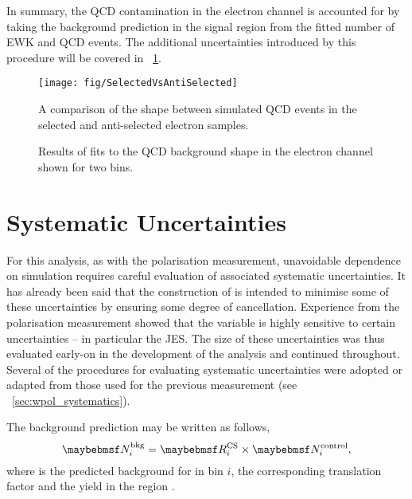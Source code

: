 In summary, the \ac{QCD} contamination in the electron channel is accounted for
by taking the background prediction in the signal region from the fitted number
of \ac{EWK} and \ac{QCD} events. The additional uncertainties introduced by this
procedure will be covered in \sec~\ref{sec:susy_systematics}.

\begin{figure}
\centering
\texttt{[image: fig/SelectedVsAntiSelected]}
\caption[\acs{MC} \LP shape comparison between selected and anti-selected
\acs{QCD} events]{A comparison of the \LP shape between simulated \ac{QCD} events
  in the selected and anti-selected electron samples.}
\label{fig:susy_elqcd_selasel}
\end{figure}


\begin{figure}
\centering
{}\quad
{}
\caption[Results of fits to the \acs{QCD} background shape in the electron
channel]{Results of fits to the \ac{QCD} background shape in the electron
  channel shown for two \STlep bins.}
\label{fig:susy_elqcd}
\end{figure}

\section{Systematic Uncertainties}
\label{sec:susy_systematics}
For this analysis, as with the \PW polarisation measurement, unavoidable
dependence on simulation requires careful evaluation of associated systematic
uncertainties. It has already been said that the construction of \RCS is
intended to minimise some of these uncertainties by ensuring some degree of
cancellation. Experience from the \PW polarisation measurement showed that the
\LP variable is highly sensitive to certain uncertainties -- in particular the
\ac{JES}. The size of these uncertainties was thus evaluated early-on in the
development of the analysis and continued throughout. Several of the procedures
for evaluating systematic uncertainties were adopted or adapted from those used
for the previous measurement (see \sec~\ref{sec:wpol_systematics}).

The background prediction may be written as follows,
\begin{equation*}
\NBkgi = \RCSi \times \NControli,
\end{equation*}
where \NBkgi is the predicted background for \LPsignal in \STlep bin $i$, \RCSi
the corresponding translation factor and \NControli the yield in the region
\LPcontrol.


